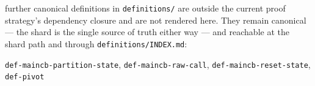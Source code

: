 





\par{} further canonical definitions in \texttt{definitions/} are outside the current proof strategy's dependency closure and are not rendered here. They remain canonical --- the shard is the single source of truth either way --- and reachable at the shard path and through \texttt{definitions/INDEX.md}:
{\footnotesize\par\smallskip\noindent \texttt{def-\allowbreak{}maincb-\allowbreak{}partition-\allowbreak{}state}, \texttt{def-\allowbreak{}maincb-\allowbreak{}raw-\allowbreak{}call}, \texttt{def-\allowbreak{}maincb-\allowbreak{}reset-\allowbreak{}state}, \texttt{def-\allowbreak{}pivot}\par}
